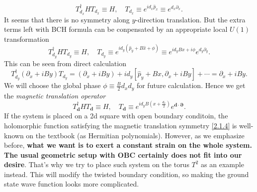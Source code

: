 \documentclass[10pt,nofootinbib,letterpaper]{revtex4}
\begin{document}
		\begin{equation*}
			T_{d_x}^\dagger HT_{d_x}\equiv H,\quad T_{d_x}\equiv e^{id_x\hat{p}_x}\equiv e^{d_x \partial_x}.
		\end{equation*}
		It seems that there is no symmetry along $y$-direction translation. But the extra terms left with BCH formula can be conpensated by an appropriate local $U(1)$ transformation
		\begin{equation*}
			T_{d_y}^\dagger H T_{d_y}\equiv H,\quad T_{d_y}\equiv e^{id_y(\hat{p}_y+B\hat{x}+\phi)}\equiv e^{id_yBx+i\phi}e^{d_y \partial_y}.
		\end{equation*}
		This can be seen from direct calculation
		\begin{equation*}
			T_{d_y}^\dagger(\partial_x+iBy)T_{d_y}=(\partial_x+iBy)+id_y[\hat{p}_y+Bx,\partial_x+iBy]+\cdots=\partial_x+iBy.
		\end{equation*}
		We will choose the global phase $\phi\equiv\frac B2d_xd_y$ for future calculation. Hence we get the \emph{magnetic translation operator}
		\begin{equation}\label{2.1.4}
			T_{\bm{d}}^\dagger HT_{\bm{d}}\equiv H,\quad T_{\bm{d}}\equiv e^{id_yB(x+\frac{d_x}{2})}e^{\bm{d\cdot\partial}}.
		\end{equation}
		If the system is placed on a 2d square with open boundary conditoin, the holomorphic function satisfying the magnetic translation symmetry \eqref{2.1.4} is well-known on the textbook (as Hermitian polynomials). However, as we emphasize before, \textbf{what we want is to exert a constant strain on the whole system. The usual geometric setup with OBC certainly does not fit into our desire}. That's why we try to place such system on the torus $T^2$ as an example instead. This will modify the twisted boundary condition, so making the ground state wave function looks more complicated.
\end{document}
